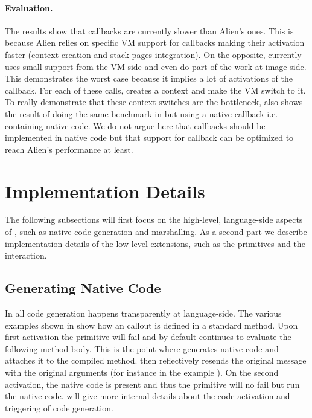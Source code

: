 \paragraph{Evaluation.}
The results show that \NB callbacks are currently slower than Alien's ones.
This is because Alien relies on specific VM support for callbacks making their activation faster (context creation and stack pages integration).
On the opposite, \NB currently uses small support from the VM side and even do part of the work at image side.
This  demonstrates the worst case because it implies a lot of activations of the callback.
For each of these calls, \NB creates a context and make the VM switch to it.
To really demonstrate that these context switches are the bottleneck,  also shows the result of doing the same benchmark in \NB but using a native callback i.e. containing native code.
We do not argue here that callbacks should be implemented in native code but that \NB support for callback can be optimized to reach Alien's performance at least.

\section{\NBFFI Implementation Details}

The following subsections will first focus on the high-level, language-side aspects of \NB, such as native code generation and marshalling.
As a second part we describe implementation details of the low-level extensions, such as the \NB primitives and the \JIT interaction.

\subsection{Generating Native Code}

In \NB all code generation happens transparently at language-side.
The various examples shown in  show how an \FFI callout is defined in a standard method.
Upon first activation the \NB primitive will fail and by default continues to evaluate the following method body.
This is the point where \NB generates native code and attaches it to the compiled method.
\NB then reflectively resends the original message with the original arguments (for instance  in the example ).
On the second activation, the native code is present and thus the primitive will no fail but run the native code.
 will give more internal details about the code activation and triggering of code generation.


